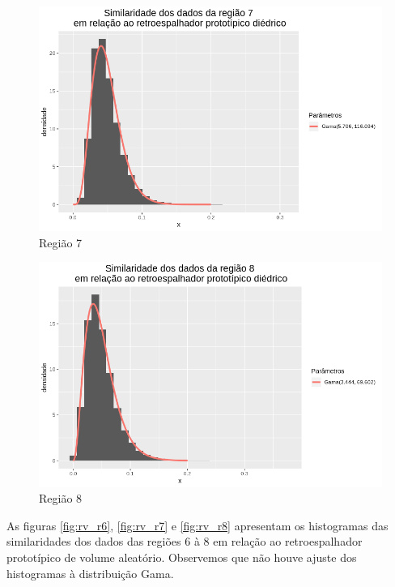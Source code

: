 \documentclass[12pt]{article}
\begin{document}
\begin{figure}[!h]
    \centering
    \vspace{0.1\linewidth}
    \includegraphics[width = 0.95\linewidth]{../../Images/Report_18_12_17/di_region7.png}
    \caption{Região 7}
    \label{fig:di_r7}
\end{figure}

\begin{figure}[!h]
    \centering    
    \vspace{0.1\linewidth}
    \includegraphics[width = 0.95\linewidth]{../../Images/Report_18_12_17/di_region8.png}
    \caption{Região 8}
    \label{fig:di_r8}
\end{figure}

As figuras \ref{fig:rv_r6}, \ref{fig:rv_r7} e \ref{fig:rv_r8} apresentam os histogramas das similaridades dos dados das regiões 6 à 8 em relação ao retroespalhador prototípico de volume aleatório. Observemos que não houve ajuste dos histogramas à distribuição Gama.
\end{document}
